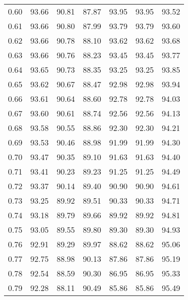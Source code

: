 \begin{tabular}{|c|c|c|c|c|c|c|}
      0.60 &     93.66 &     90.81 &      87.87 &   93.95 &      93.95 &         93.52 \\
      0.61 &     93.66 &     90.80 &      87.99 &   93.79 &      93.79 &         93.60 \\
      0.62 &     93.66 &     90.78 &      88.10 &   93.62 &      93.62 &         93.68 \\
      0.63 &     93.66 &     90.76 &      88.23 &   93.45 &      93.45 &         93.77 \\
      0.64 &     93.65 &     90.73 &      88.35 &   93.25 &      93.25 &         93.85 \\
      0.65 &     93.62 &     90.67 &      88.47 &   92.98 &      92.98 &         93.94 \\
      0.66 &     93.61 &     90.64 &      88.60 &   92.78 &      92.78 &         94.03 \\
      0.67 &     93.60 &     90.61 &      88.74 &   92.56 &      92.56 &         94.13 \\
      0.68 &     93.58 &     90.55 &      88.86 &   92.30 &      92.30 &         94.21 \\
      0.69 &     93.53 &     90.46 &      88.98 &   91.99 &      91.99 &         94.30 \\
      0.70 &     93.47 &     90.35 &      89.10 &   91.63 &      91.63 &         94.40 \\
      0.71 &     93.41 &     90.23 &      89.23 &   91.25 &      91.25 &         94.49 \\
      0.72 &     93.37 &     90.14 &      89.40 &   90.90 &      90.90 &         94.61 \\
      0.73 &     93.25 &     89.92 &      89.51 &   90.33 &      90.33 &         94.71 \\
      0.74 &     93.18 &     89.79 &      89.66 &   89.92 &      89.92 &         94.81 \\
      0.75 &     93.05 &     89.55 &      89.80 &   89.30 &      89.30 &         94.93 \\
      0.76 &     92.91 &     89.29 &      89.97 &   88.62 &      88.62 &         95.06 \\
      0.77 &     92.75 &     88.98 &      90.13 &   87.86 &      87.86 &         95.19 \\
      0.78 &     92.54 &     88.59 &      90.30 &   86.95 &      86.95 &         95.33 \\
      0.79 &     92.28 &     88.11 &      90.49 &   85.86 &      85.86 &         95.49 \\

\end{tabular}
